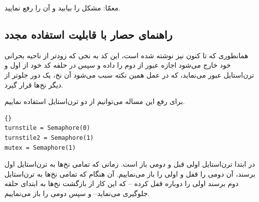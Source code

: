 \documentclass{book}
\newcommand{\clearemptydoublepage}{\newpage\cleardoublepage}
\begin{document}
    معمّا: مشکل را بیابید و آن را رفع نمایید. 


\clearemptydoublepage
\subsection {راهنمای حصار با قابلیت استفاده مجدد}

    همانطوری که تا کنون نیز نوشته شده است، این کد به نخی که زودتر از ناحیه بحرانی خود خارج می‌شود 
    اجازه عبور از  دوم را داده و سپس در حلقه کد خود از  
    اول و ترن‌استایل عبور می‌نماید، که در عمل همین نکته سبب می‌شود آن نخ، یک دور جلوتر از دیگر نخ‌ها قرار گیرد. 

    برای رفع این مساله می‌توانیم از دو ترن‌استایل استفاده نماییم. 

\begin{latin}
\begin{latin}
\begin{lstlisting}[title=\rl{{  راهنمای حصار با قابلیت استفاده مجدد}}]{} 
turnstile = Semaphore(0)
turnstile2 = Semaphore(1)
mutex = Semaphore(1)
\end{lstlisting}
\end{latin}
\end{latin}

    در ابتدا ترن‌استایل اولی قبل و دومی باز است. زمانی که تمامی نخ‌ها به ترن‌استایل اول برسند، آن دومی را قفل  و اولی را باز می‌نماییم. 
    آن هنگام که تمامی نخ‌ها به ترن‌استایل دوم برسند اولی را دوباره قفل کرده --%
    که این کار از بازگشت نخ‌ها به ابتدای حلقه جلوگیری می‌نماید--
    و سپس دومی را باز می‌نماییم.


\clearemptydoublepage
\end{document}

